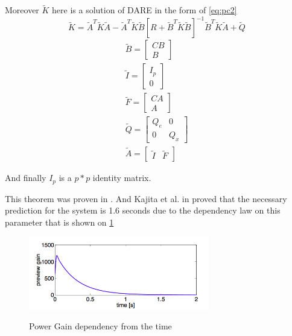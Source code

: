 \documentclass[12pt,a4paper]{report}
\begin{document}
			Moreover $\tilde{K}$ here is a solution of DARE in the form of \ref{eq:pc2}
			\begin{equation}\label{eq:pc2}
				\tilde{K} = \tilde{A}^T\tilde{K}\tilde{A} - \tilde{A}^T \tilde{K} \tilde{B} [R + \tilde{B}^T \tilde{K} \tilde{B}]^{-1} \tilde{B}^T\tilde{K}\tilde{A} + \tilde{Q}
			\end{equation}
			\begin{equation}\label{eq:pc3}
				\begin{split}
					\tilde{B} = \begin{bmatrix} C B \\ B \end{bmatrix}\\
					\tilde{I} = \begin{bmatrix} I_p \\ 0 \end{bmatrix}\\
					\tilde{F} = \begin{bmatrix} CA \\ A \end{bmatrix}\\
					\tilde{Q} = \begin{bmatrix} Q_e & 0 \\ 0 & Q_x \end{bmatrix}\\
					\tilde{A} = \begin{bmatrix} \tilde{I} & \tilde{F} \end{bmatrix}
				\end{split}
			\end{equation}
			
			And finally $I_p$ is a $p * p$ identity matrix.
			
			This theorem was proven in \cite{katayama1985design}. And Kajita et al. in \cite{kajita2003biped} proved that the necessary prediction for the system is 1.6 seconds due to the dependency law on this parameter that is shown on \cref{fig:12} 
			
			\begin{figure}[h!]
				\vspace{-0.2cm}
				\centering
				{\includegraphics[width=0.7\textwidth]{12}}
				\caption{Power Gain dependency from the time \cite{kajita2003biped}}
				\label{fig:12}
				\vspace{-0.1cm}
			\end{figure}
			
\end{document}
